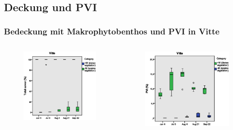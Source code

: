 \documentclass{beamer}
\begin{document}
\subsection{Deckung und PVI}
\begin{frame}
\frametitle{Bedeckung mit Makrophytobenthos und PVI in Vitte}
\begin{columns}
\begin{column}{5.5cm}
\begin{figure}
\includegraphics[width=\textwidth]{images/total_cover/Boxplots_G_V1.eps}
\end{figure}
\end{column}
\begin{column}{5.5cm}
\begin{figure}
\includegraphics[width=\textwidth]{images/pvi/boxplot_pvi1.eps}
\end{figure}
\end{column}
\end{columns}
\end{frame}
\end{document}
